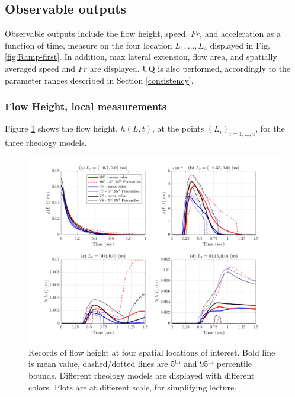 \documentclass{article}
\begin{document}
\subsection{Observable outputs} \label{Obs1}
Observable outputs include the flow height, speed, $Fr$, and acceleration as a function of time, measure on the four location $L_1,\dots, L_4$ displayed in Fig. \ref{fig:Ramp-first}. In addition, max lateral extension, flow area, and spatially averaged speed and $Fr$ are displayed. UQ is also performed, accordingly to the parameter ranges described in Section \ref{consistency}.

\subsubsection{Flow Height, local measurements}
Figure \ref{fig:Ramp-H} shows the flow height, $h(L,t)$, at the points $(L_i)_{i=1,\dots,4}$, for the three rheology models.
\begin{figure}[H]
         \centering
        \includegraphics[width=1\textwidth]{InclinedPlane/LocalMeasurments/Height.png}
        \caption{Records of flow height at four spatial locations of interest. Bold line is mean value, dashed/dotted lines are 5$^{\mathrm{th}}$ and 95$^{\mathrm{th}}$ percentile bounds. Different rheology models are displayed with different colors. Plots are at different scale, for simplifying lecture.}
        \label{fig:Ramp-H}
\end{figure}
\end{document}
